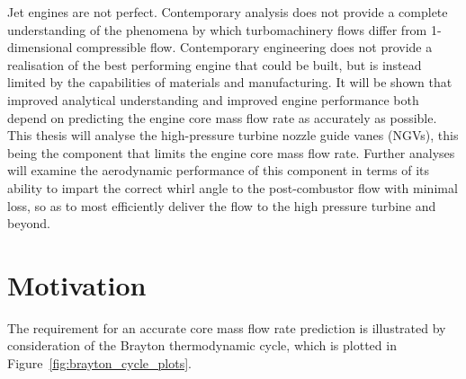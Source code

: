 \documentclass[a4paper, 11pt, oneside]{report}
\begin{document}
Jet engines are not perfect. Contemporary analysis does not provide a complete understanding of the phenomena by which turbomachinery flows differ from 1-dimensional compressible flow. Contemporary engineering does not provide a realisation of the best performing engine that could be built, but is instead limited by the capabilities of materials and manufacturing. It will be shown that improved analytical understanding and improved engine performance both depend on predicting the engine core mass flow rate as accurately as possible. This thesis will analyse the high-pressure turbine nozzle guide vanes (NGVs), this being the component that limits the engine core mass flow rate. Further analyses will examine the aerodynamic performance of this component in terms of its ability to impart the correct whirl angle to the post-combustor flow with minimal loss, so as to most efficiently deliver the flow to the high pressure turbine and beyond.

\section{Motivation}

The requirement for an accurate core mass flow rate prediction is illustrated by consideration of the Brayton thermodynamic cycle, which is plotted in Figure~\ref{fig:brayton_cycle_plots}.
\end{document}
